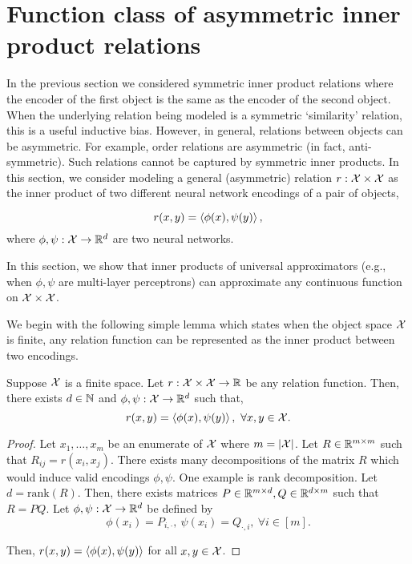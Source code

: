 \section{Function class of asymmetric inner product relations}\label{sec:asymmetric_relations}

In the previous section we considered symmetric inner product relations where the encoder of the first object is the same as the encoder of the second object. When the underlying relation being modeled is a symmetric `similarity' relation, this is a useful inductive bias. However, in general, relations between objects can be asymmetric. For example, order relations are asymmetric (in fact, anti-symmetric). Such relations cannot be captured by symmetric inner products. In this section, we consider modeling a general (asymmetric) relation $r: {\mathcal{X}} \times {\mathcal{X}}$ as the inner product of two different neural network encodings of a pair of objects,


\begin{equation}\label{eq:asymmetric_iprod_relation}
    r(x, y) = \left \langle \phi(x), \psi(y) \right\rangle,
\end{equation}
where $\phi, \psi: {\mathcal{X}} \to \mathbb{R}^d$ are two neural networks.

In this section, we show that inner products of universal approximators (e.g., when $\phi, \psi$ are multi-layer perceptrons) can approximate any continuous function on ${\mathcal{X}} \times {\mathcal{X}}$.

We begin with the following simple lemma which states when the object space ${\mathcal{X}}$ is finite, any relation function can be represented as the inner product between two encodings.

\begin{lemma}\label{lemma:finite_space_rel}
    Suppose ${\mathcal{X}}$ is a finite space. Let $r: {\mathcal{X}} \times {\mathcal{X}} \to \mathbb{R}$ be any relation function. Then, there exists $d \in {\mathbb{N}}$ and $\phi, \psi : {\mathcal{X}} \to \mathbb{R}^{d}$ such that,
    \begin{equation*}
        r(x, y) = \left \langle \phi(x), \psi(y) \right\rangle, \ \forall x, y \in {\mathcal{X}}.
    \end{equation*}
\end{lemma}

\begin{proof}
    \hphantom{~}

    Let $x_1, \ldots, x_m$ be an enumerate of ${\mathcal{X}}$ where $m = \left\lvert{\mathcal{X}}\right\rvert$. Let $R \in \mathbb{R}^{m \times m}$ such that $R_{ij} = r(x_i, x_j)$. There exists many decompositions of the matrix $R$ which would induce valid encodings $\phi, \psi$. One example is rank decomposition. Let $d = \mathrm{rank}(R)$. Then, there exists matrices $P \in \mathbb{R}^{m \times d}, Q \in \mathbb{R}^{d \times m}$ such that $R = P Q$. Let $\phi, \psi: {\mathcal{X}} \to \mathbb{R}^{d}$ be defined by
    \begin{equation}
        \phi(x_i) = P_{i, \cdot}, \ \psi(x_i) = Q_{\cdot, i}, \ \forall i \in [m].
    \end{equation}

    Then, $r(x, y) = \left \langle \phi(x), \psi(y) \right\rangle$ for all $x, y \in {\mathcal{X}}$.
\end{proof}

